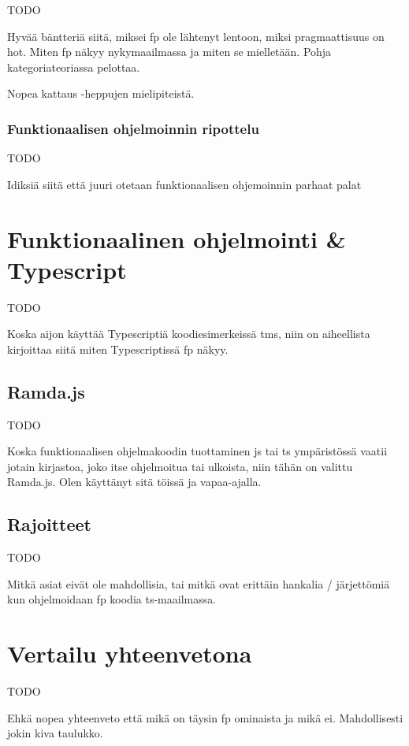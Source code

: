 TODO

Hyvää bäntteriä siitä, miksei fp ole lähtenyt lentoon, miksi pragmaattisuus on hot. Miten fp näkyy nykymaailmassa ja miten se mielletään. Pohja kategoriateoriassa pelottaa.

Nopea kattaus  -heppujen mielipiteistä.

\subsubsection{Funktionaalisen ohjelmoinnin ripottelu}

TODO

Idiksiä siitä että juuri otetaan funktionaalisen ohjemoinnin parhaat palat

\section{Funktionaalinen ohjelmointi \& Typescript}


TODO

Koska aijon käyttää Typescriptiä koodiesimerkeissä tms, niin on aiheellista kirjoittaa siitä miten Typescriptissä \gls{fp} näkyy.

\subsection{Ramda.js}

TODO

Koska funktionaalisen ohjelmakoodin tuottaminen \gls{js} tai \gls{ts} ympäristössä vaatii jotain kirjastoa, joko itse ohjelmoitua tai ulkoista, niin tähän on valittu Ramda.js. Olen käyttänyt sitä töissä ja vapaa-ajalla.

\subsection{Rajoitteet}

TODO

Mitkä asiat eivät ole mahdollisia, tai mitkä ovat erittäin hankalia / järjettömiä kun ohjelmoidaan \gls{fp} koodia \gls{ts}-maailmassa.


\section{Vertailu yhteenvetona}

TODO

Ehkä nopea yhteenveto että mikä on täysin \gls{fp} ominaista ja mikä ei. Mahdollisesti jokin kiva taulukko.